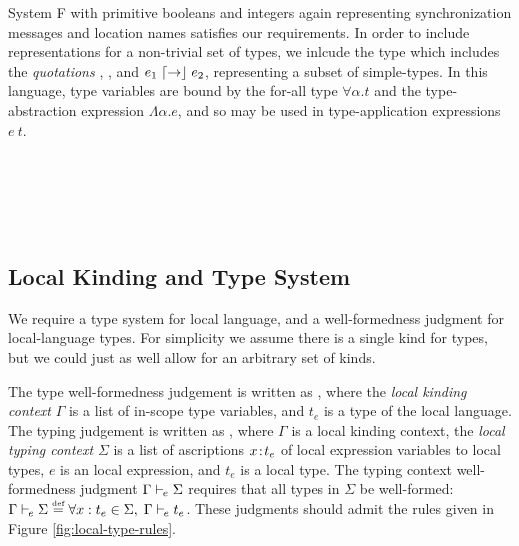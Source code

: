 \begin{ex}[System F]
  \label{ex:system-f}
  System F with primitive booleans and integers again representing synchronization messages and location names satisfies our requirements.
  In order to include representations for a non-trivial set of types, we inlcude the type \Typ which includes the \emph{quotations} \say{\Int}, \say{\Bool}, and $e_1 \mathrel{\lceil\mathord{\to}\rfloor} e_2$, representing a subset of simple-types.
  In this language, type variables are bound by the for-all type $\forall \alpha.t$ and the type-abstraction expression $\Lambda \alpha.e$, and so may be used in type-application expressions $e~t$.
  \begin{syntax}
  	 \alternative{\alpha} \alternative{\Int} \alternative{\Bool} \alternative{\Typ}\\
  	 
         \\
      \\
    \alternative{\True} \alternative{\False} \\
    \alternative{\say{\Int}} \alternative{\say{\Bool}} 
  \end{syntax}
\end{ex}


\subsection{Local Kinding and Type System}
\label{sec:local-types}
We require a type system for local language, and a well-formedness judgment for local-language types.
For simplicity we assume there is a single kind for types, but we could just as well allow for an arbitrary set of kinds.

The type well-formedness judgement is written as , where the \emph{local kinding context} $\Gamma$ is a list of in-scope type variables, and $t_e$ is a type of the local language.
The typing judgement is written as , where $\Gamma$ is a local kinding context, the \emph{local typing context} $\Sigma$ is a list of ascriptions $x \mkern2mu{:}\mkern2mu t_e$ of local expression variables to local types, $e$ is an local expression, and $t_e$ is a local type.
The typing context well-formedness judgment $\Gamma \vdash_{\mkern-2mu e} \Sigma$ requires that all types in $\Sigma$ be well-formed: $\Gamma \vdash_{\mkern-2mu e} \Sigma \stackrel{\text{\normalfont\tiny def}}{=} \forall {x : t_e \in \Sigma},\;\Gamma \vdash_{\mkern-2mu e} t_e$.
These judgments should admit the rules given in Figure \ref{fig:local-type-rules}.

